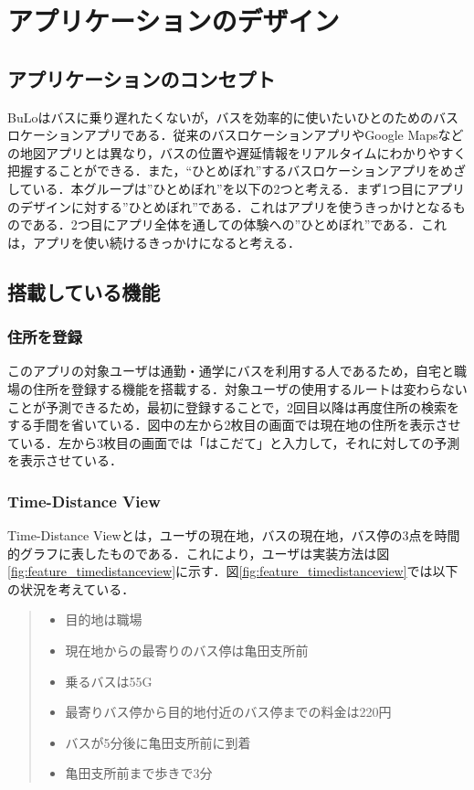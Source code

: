 \chapter{アプリケーションのデザイン}

\section{アプリケーションのコンセプト}
BuLoはバスに乗り遅れたくないが，バスを効率的に使いたいひとのためのバスロケーションアプリである．従来のバスロケーションアプリやGoogle Mapsなどの地図アプリとは異なり，バスの位置や遅延情報をリアルタイムにわかりやすく把握することができる．また，“ひとめぼれ”するバスロケーションアプリをめざしている．本グループは”ひとめぼれ”を以下の2つと考える．まず1つ目にアプリのデザインに対する”ひとめぼれ”である．これはアプリを使うきっかけとなるものである．2つ目にアプリ全体を通しての体験への”ひとめぼれ”である．これは，アプリを使い続けるきっかけになると考える．

\section{搭載している機能}
\subsection{住所を登録}
このアプリの対象ユーザは通勤・通学にバスを利用する人であるため，自宅と職場の住所を登録する機能を搭載する．対象ユーザの使用するルートは変わらないことが予測できるため，最初に登録することで，2回目以降は再度住所の検索をする手間を省いている．図中の左から2枚目の画面では現在地の住所を表示させている．左から3枚目の画面では「はこだて」と入力して，それに対しての予測を表示させている．
\subsection{Time-Distance View}
Time-Distance Viewとは，ユーザの現在地，バスの現在地，バス停の3点を時間的グラフに表したものである．これにより，ユーザは実装方法は図\ref{fig:feature_timedistanceview}に示す．図\ref{fig:feature_timedistanceview}では以下の状況を考えている．
\begin{quote}
    \begin{itemize}
        \item 目的地は職場
        \item 現在地からの最寄りのバス停は亀田支所前
        \item 乗るバスは55G
        \item 最寄りバス停から目的地付近のバス停までの料金は220円
        \item バスが5分後に亀田支所前に到着
        \item 亀田支所前まで歩きで3分
    \end{itemize}
\end{quote}

